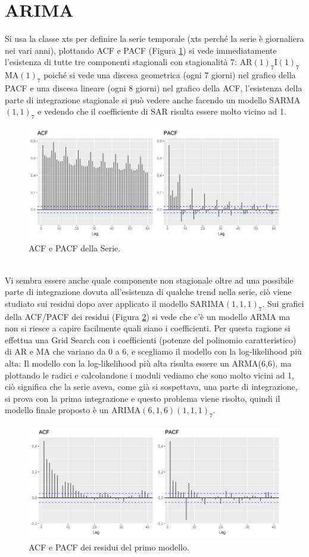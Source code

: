 \documentclass[12pt, onecolumn]{article}
\begin{document}
\section*{ARIMA}
Si usa la classe xts per definire la serie temporale (xts perché la serie è giornaliera nei vari anni), plottando ACF e PACF (Figura \ref{fig:ACF_1}) si vede immediatamente l'esistenza di tutte tre componenti stagionali con stagionalità 7: AR$(1)_7$I$(1)_7$MA$(1)_7$ poiché si vede una discesa geometrica (ogni 7 giorni) nel grafico della PACF e una discesa lineare (ogni 8 giorni) nel grafico della ACF, l'esistenza della parte di integrazione stagionale si può vedere anche facendo un modello SARMA$(1,1)_7$ e vedendo che il coefficiente di SAR risulta essere molto vicino ad 1. 
\begin{figure}[!h]
  \centering
  \includegraphics[width=\linewidth,height=5cm]{imgs/ACF_1.png}
  \caption{ACF e PACF della Serie.}
  \label{fig:ACF_1}
\end{figure}\\
Vi sembra essere anche quale componente non stagionale oltre ad una possibile parte di integrazione dovuta all'esistenza di qualche trend nella serie, ciò viene studiato sui residui dopo aver applicato il modello SARIMA$(1,1,1)_7$.
Sui grafici della ACF/PACF dei residui (Figura \ref{fig:ACF_2}) si vede che c'è un modello ARMA ma non si riesce a capire facilmente quali siano i coefficienti.
Per questa ragione si effettua una Grid Search con i coefficienti (potenze del polinomio caratteristico) di AR e MA che variano da 0 a 6, e scegliamo il modello con la log-likelihood più alta: Il modello con la log-likelihood più alta risulta essere un ARMA(6,6), ma plottando le radici e calcolandone i moduli vediamo che sono molto vicini ad 1, ciò significa che la serie aveva, come già si sospettava,  una parte di integrazione, si prova con la prima integrazione e questo problema viene risolto, quindi il modello finale proposto è un ARIMA$(6,1,6)(1,1,1)_7$.\\
\begin{figure}[!h]
  \centering
  \includegraphics[width=\linewidth,height=5cm]{imgs/ACF_2.png}
  \caption{ACF e PACF dei residui del primo modello.}
  \label{fig:ACF_2}
\end{figure}
\end{document}
